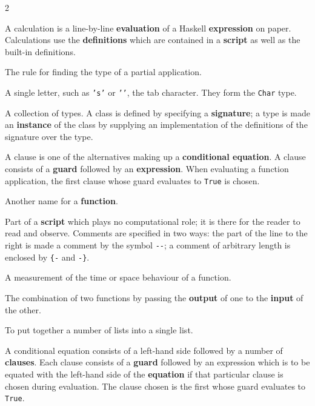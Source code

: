 \begin{multicols}{2}
{
A calculation is a line-by-line \textbf{evaluation} of a Haskell \textbf{expression}
on paper. Calculations use the \textbf{definitions} which are contained in a
\textbf{script} as well as the built-in definitions.

The rule for finding the type of a partial application.

A single letter, such as \texttt{'s'} or \texttt{''}, the tab character.
They form the \texttt{Char} type.

A collection of types. A class is defined by specifying a \textbf{signature};
a type is made an \textbf{instance} of the class by supplying an
implementation of the definitions of the signature over the type.

A clause is one of the alternatives making up a \textbf{conditional 
equation}. A clause consists of a \textbf{guard} followed by an \textbf{expression}. 
When evaluating a function application, the first clause whose
guard evaluates to \texttt{True} is chosen.

Another name for a \textbf{function}.

Part of a \textbf{script} which plays no computational role; it is there for the
reader to read and observe. Comments are specified in two ways: the part of
the line to the right is made a comment by the symbol \texttt{-{}-}; a comment of
arbitrary length is enclosed by \texttt{\{-} and \texttt{-\}}.

A measurement of the time or space behaviour of a function.

The combination of two functions by passing the \textbf{output} of one to the
\textbf{input} of the other.

To put together a number of lists into a single list.

A conditional equation consists of a left-hand side followed by a number of
\textbf{clauses}. Each clause consists of a \textbf{guard} followed by an expression
which is to be equated with the left-hand side of the \textbf{equation} if that
particular clause is chosen during evaluation. The clause chosen is the first
whose guard evaluates to \texttt{True}.


}
\end{multicols}
